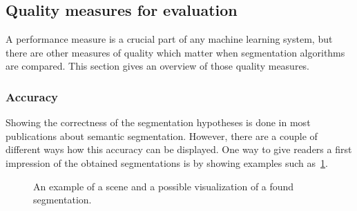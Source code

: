 \subsection{Quality measures for evaluation}%
\label{subsec:quality-measures}%
A performance measure is a crucial part of any machine learning system, but
there are other measures of quality which matter when segmentation algorithms
are compared. This section gives an overview of those quality measures.


\subsubsection{Accuracy}
Showing the correctness of the segmentation hypotheses is done in most
publications about semantic segmentation. However, there are a couple of
different ways how this accuracy can be displayed. One way to give readers a
first impression of the obtained segmentations is by showing examples such
as~\cref{fig:segmentation-example}.

\begin{figure}
\centering
{}%
\caption{An example of a scene and a possible visualization of a found segmentation.}
\label{fig:segmentation-example}
\end{figure}

